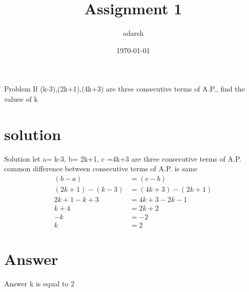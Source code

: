 \documentclass{beamer}
\title{Assignment 1}
\author{adarsh}
\date{\today}
\begin{document}
\begin{frame}
    \titlepage 
\end{frame}

\logo{}


\begin{frame}{Problem}
   If (k-3),(2k+1),(4k+3) are three consecutive terms of A.P., find the valuee of k

\end{frame}


\section{solution}
\begin{frame}{Solution}
let a= k-3, b= 2k+1, c =4k+3 are three consecutive terms of A.P.\\

common difference between consecutive terms of A.P. is same\\
\begin{align}
(b-a) & = (c-b)\\
(2k+1)-(k-3)& =(4k+3)-(2k+1)\\
2k+1 -k+3 & = 4k+3 -2k-1\\
k + 4 & = 2k + 2\\
-k  & =  -2\\
k & = 2
\end{align}

\end{frame}


\section{Answer}
\begin{frame}{Answer}
k is equal to 2    
\end{frame} 
\end{document}
